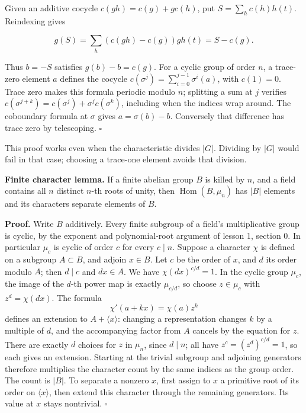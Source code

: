 \documentclass[11pt,a4paper]{article}
\begin{document}
Given an additive cocycle \(c(gh)=c(g)+g c(h)\), put
\(S=\sum_h c(h)h(t)\). Reindexing gives

\[
g(S)=\sum_h(c(gh)-c(g))gh(t)=S-c(g).
\]

Thus \(b=-S\) satisfies \(g(b)-b=c(g)\). For a cyclic group of order
\(n\), a trace-zero element \(a\) defines the cocycle
\(c(\sigma^j)=\sum_{i=0}^{j-1}\sigma^i(a)\), with \(c(1)=0\). Trace zero
makes this formula periodic modulo \(n\); splitting a sum at \(j\)
verifies \(c(\sigma^{j+k})=c(\sigma^j)+\sigma^j c(\sigma^k)\), including
when the indices wrap around. The coboundary formula at \(\sigma\) gives
\(a=\sigma(b)-b\). Conversely that difference has trace zero by
telescoping. \(\square\)

This proof works even when the characteristic divides \(|G|\). Dividing
by \(|G|\) would fail in that case; choosing a trace-one element avoids
that division.

\textbf{Finite character lemma.} If a finite abelian group \(B\) is
killed by \(n\), and a field contains all \(n\) distinct \(n\)-th roots
of unity, then \(\operatorname{Hom}(B,\mu_n)\) has \(|B|\) elements and
its characters separate elements of \(B\).

\textbf{Proof.} Write \(B\) additively. Every finite subgroup of a
field's multiplicative group is cyclic, by the exponent and
polynomial-root argument of lesson 1, section 0. In particular \(\mu_c\)
is cyclic of order \(c\) for every \(c\mid n\). Suppose a character
\(\chi\) is defined on a subgroup \(A\subset B\), and adjoin \(x\in B\).
Let \(c\) be the order of \(x\), and \(d\) its order modulo \(A\); then
\(d\mid c\) and \(dx\in A\). We have \(\chi(dx)^{c/d}=1\). In the cyclic
group \(\mu_c\), the image of the \(d\)-th power map is exactly
\(\mu_{c/d}\), so choose \(z\in\mu_c\) with \(z^d=\chi(dx)\). The
formula \[
\chi'(a+kx)=\chi(a)z^k
\] defines an extension to \(A+\langle x\rangle\): changing a
representation changes \(k\) by a multiple of \(d\), and the
accompanying factor from \(A\) cancels by the equation for \(z\). There
are exactly \(d\) choices for \(z\) in \(\mu_n\), since \(d\mid n\); all
have \(z^c=(z^d)^{c/d}=1\), so each gives an extension. Starting at the
trivial subgroup and adjoining generators therefore multiplies the
character count by the same indices as the group order. The count is
\(|B|\). To separate a nonzero \(x\), first assign to \(x\) a primitive
root of its order on \(\langle x\rangle\), then extend this character
through the remaining generators. Its value at \(x\) stays nontrivial.
\(\square\)
\end{document}
